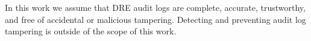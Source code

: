 In this work we assume that DRE audit logs are complete, accurate,  trustworthy, and free of accidental or malicious tampering. Detecting and preventing audit log tampering is outside of the scope of this work.












